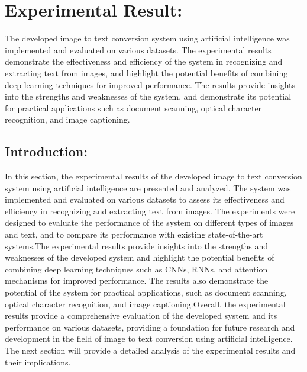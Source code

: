 \section{Experimental Result:}
The developed image to text conversion system using artificial intelligence was implemented and evaluated on various datasets. The experimental results demonstrate the effectiveness and efficiency of the system in recognizing and extracting text from images, and highlight the potential benefits of combining deep learning techniques for improved performance. The results provide insights into the strengths and weaknesses of the system, and demonstrate its potential for practical applications such as document scanning, optical character recognition, and image captioning.
\subsection{Introduction:}
In this section, the experimental results of the developed image to text conversion system using artificial intelligence are presented and analyzed. The system was implemented and evaluated on various datasets to assess its effectiveness and efficiency in recognizing and extracting text from images. The experiments were designed to evaluate the performance of the system on different types of images and text, and to compare its performance with existing state-of-the-art systems.The experimental results provide insights into the strengths and weaknesses of the developed system and highlight the potential benefits of combining deep learning techniques such as CNNs, RNNs, and attention mechanisms for improved performance. The results also demonstrate the potential of the system for practical applications, such as document scanning, optical character recognition, and image captioning.Overall, the experimental results provide a comprehensive evaluation of the developed system and its performance on various datasets, providing a foundation for future research and development in the field of image to text conversion using artificial intelligence. The next section will provide a detailed analysis of the experimental results and their implications.  
